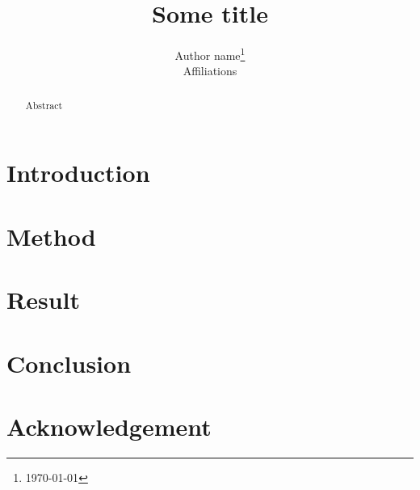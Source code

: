 \documentclass{article}
\title{Some title}
\author{Author name\thanks{\today}\\
    Affiliations}
\begin{document}
\maketitle

\begin{abstract}
Abstract
\end{abstract}

\section{Introduction}



\section{Method}



\section{Result}



\section{Conclusion}



\section*{Acknowledgement}


\printbibliography
\end{document}
